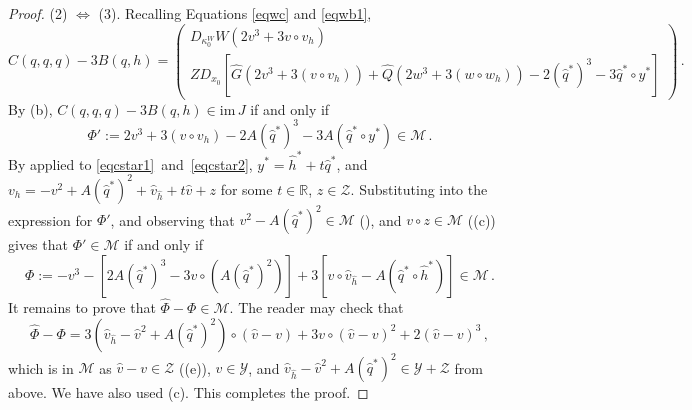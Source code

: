 \documentclass[11pt]{amsart}
\renewcommand{\k}{\kappa}
\newcommand{\R}{\mathbb{R}}
\newcommand{\wQ}{\widehat{Q}}
\newcommand{\wG}{\widehat{G}}
\newcommand{\mM}{\mathcal{M}}
\newcommand{\mY}{\mathcal{Y}}
\newcommand{\mZ}{\mathcal{Z}}
\theoremstyle{definition}
\begin{document}
\begin{proof}
(2) $\Leftrightarrow$ (3). Recalling Equations \eqref{eqwc} and \eqref{eqwb1},
\[
C(q,q,q) - 3B(q,h) = \left(\begin{array}{c} D_{\k_0^W}W (2v^3 +3 v\circ v_h)\\Z D_{x_0}[\wG(2 v^3 + 3(v \circ v_h)) +\wQ(2w^3 +3(w\circ w_h)) -2(\hat{q}^*)^3 - 3\hat{q}^* \circ y^*] \end{array}\right)\,.
\]
By (b), $C(q,q,q) - 3B(q,h) \in \mathrm{im}\,J$ if and only if 
\[
\Phi' := 2 v^3 + 3(v \circ v_h) - 2A(\hat{q}^*)^3 - 3A(\hat{q}^* \circ y^*) \in \mM\,.
\]
By  applied to \eqref{eqcstar1}~and~\eqref{eqcstar2}, $y^* = \hat{h}^* + t\hat{q}^*$, and $v_h = -v^2 + A(\hat{q}^*)^2 + \hat{v}_{\hat{h}} +t\hat{v} + z$ for some $t \in \R$, $z \in \mZ$. Substituting into the expression for $\Phi'$, and observing that $v^2 -A(\hat{q}^*)^2 \in \mM$ (), and $v \circ z \in \mM$ ((c)) gives that $\Phi' \in \mM$ if and only if 
\[
\Phi:= -v^3 -[2A(\hat{q}^*)^3 - 3v \circ (A(\hat{q}^*)^2)] + 3[v\circ\hat{v}_{\hat{h}} - A(\hat{q}^* \circ \hat{h}^*)] \in \mM\,.
\]
It remains to prove that $\widehat{\Phi} - \Phi \in \mM$. The reader may check that
\[
\widehat{\Phi}- \Phi = 3(\hat{v}_{\hat{h}} - \hat{v}^2+A (\hat{q}^*)^2)\circ (\hat{v}-v) +3v\circ(\hat{v}-v)^2 + 2(\hat{v}-v)^3\,,
\]
which is in $\mM$ as $\hat{v}-v \in \mZ$ ((e)), $v \in \mY$, and $\hat{v}_{\hat{h}} - \hat{v}^2+A (\hat{q}^*)^2 \in \mY+\mZ$ from above.
We have also used (c). This completes the proof. 
\end{proof}
\end{document}
